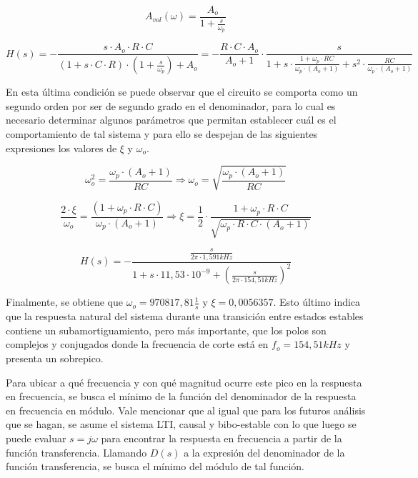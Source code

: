 \begin{equation}
	A_{vol}(\omega) = \frac{A_o}{1 + \frac{s}{\omega_p}}
	\label{eq:polo_dominante}
\end{equation}

\begin{equation}
	H(s) = - \frac{s \cdot A_{o} \cdot R \cdot C}{(1 + s \cdot C \cdot R) \cdot (1 + \frac{s}{\omega_p}) + A_{o}} = - \frac{R \cdot C \cdot A_{o}}{A_{o} + 1} \cdot \frac{s}{1 + s \cdot \frac{1 + \omega_p \cdot RC}{\omega_p \cdot(A_o + 1)} + s^{2} \cdot \frac{RC}{\omega_p \cdot (A_o + 1)}}
\end{equation}

En esta \'ultima condici\'on se puede observar que el circuito se comporta
como un segundo orden por ser de segundo grado en el denominador, 
para lo cual es necesario determinar algunos par\'ametros que permitan
establecer cu\'al es el comportamiento de tal sistema y para ello se 
despejan de las siguientes expresiones los valores de $\xi$ y $\omega_o$.

\begin{equation*}
	\omega_o^{2} = \frac{\omega_p \cdot (A_o + 1)}{RC} \Rightarrow \omega_o = \sqrt{\frac{\omega_p \cdot (A_o + 1)}{RC}}	
\end{equation*}

\begin{equation*}
	\frac{2 \cdot \xi}{\omega_o} = \frac{(1 + \omega_p \cdot R \cdot C)}{\omega_p \cdot(A_o + 1)}
	\Rightarrow \xi = \frac{1}{2} \cdot \frac{1 + \omega_p \cdot R \cdot C}{\sqrt{\omega_p \cdot R \cdot C \cdot (A_o + 1)}}
\end{equation*}

\begin{equation}
	H(s) = - \frac{\frac{s}{2 \pi \cdot 1,591kHz}}
	{1 + s \cdot 11,53 \cdot 10^{-9} + \left( \frac{s}{2 \pi \cdot 154,51kHz} \right)^{2}}
	\label{eq:derivador_transfer_polo_dominante}
\end{equation}

Finalmente, se obtiene que $\omega_o = 970817,81 \frac{1}{s}$ y $\xi = 0,0056357$. Esto \'ultimo indica que la respuesta natural del sistema durante una transici\'on entre estados estables contiene un subamortiguamiento, pero m\'as importante, que los polos son complejos y conjugados donde la frecuencia de corte est\'a en $f_o = 154,51kHz$ y presenta un sobrepico.

Para ubicar a qu\'e frecuencia y con qu\'e magnitud ocurre este pico en la respuesta en frecuencia, se busca el m\'inimo de la funci\'on del denominador de la respuesta en frecuencia en m\'odulo. Vale mencionar que al igual que para los futuros an\'alisis que se hagan, se asume el sistema LTI, causal y bibo-estable con lo que luego se puede evaluar $s = j \omega$ para encontrar la respuesta en frecuencia a partir de la funci\'on transferencia.
Llamando $D(s)$ a la expresi\'on del denominador de la funci\'on transferencia, se busca el m\'inimo del m\'odulo de tal funci\'on.

